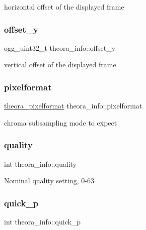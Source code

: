 horizontal offset of the displayed frame \mbox{\label{structtheora__info_a91c3922097ba32a85acd584a01dc2c93}} 
\subsubsection{\texorpdfstring{offset\+\_\+y}{offset\_y}}
{\footnotesize\ttfamily ogg\+\_\+uint32\+\_\+t theora\+\_\+info\+::offset\+\_\+y}

vertical offset of the displayed frame \mbox{\label{structtheora__info_a65ab4376ab5242ee82e06c78fb7008ab}} 
\subsubsection{\texorpdfstring{pixelformat}{pixelformat}}
{\footnotesize\ttfamily \hyperlink{group__oldfuncs_gae169da05bfaaf4e964a6866552d45079}{theora\+\_\+pixelformat} theora\+\_\+info\+::pixelformat}

chroma subsampling mode to expect \mbox{\label{structtheora__info_a71a4748a5f31bd58d0e403b7806c980d}} 
\subsubsection{\texorpdfstring{quality}{quality}}
{\footnotesize\ttfamily int theora\+\_\+info\+::quality}

Nominal quality setting, 0-\/63 \mbox{\label{structtheora__info_a2dfae4fd175dbd19254eaf0697778ff5}} 
\subsubsection{\texorpdfstring{quick\+\_\+p}{quick\_p}}
{\footnotesize\ttfamily int theora\+\_\+info\+::quick\+\_\+p}

